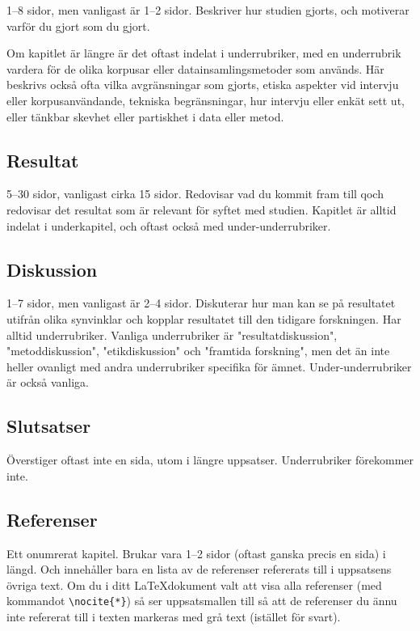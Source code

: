 1--8 sidor, men vanligast är 1--2 sidor. Beskriver hur studien gjorts, och
motiverar varför du gjort som du gjort.

Om kapitlet är längre är det oftast indelat i underrubriker, med en underrubrik
vardera för de olika korpusar eller datainsamlingsmetoder som används. Här
beskrivs också ofta vilka avgränsningar som gjorts, etiska aspekter vid
intervju eller korpusanvändande, tekniska begränsningar, hur intervju eller
enkät sett ut, eller tänkbar skevhet eller partiskhet i data eller metod.


\subsection{Resultat}
\label{rubrik.resultat}

5--30 sidor, vanligast cirka 15 sidor. Redovisar vad du kommit fram till qoch
redovisar det resultat som är relevant för syftet med studien. Kapitlet är
alltid indelat i underkapitel, och oftast också med under-underrubriker.


\subsection{Diskussion}
\label{rubrik.diskussion}

1--7 sidor, men vanligast är 2--4 sidor. Diskuterar hur man kan se på
resultatet utifrån olika synvinklar och kopplar resultatet till den tidigare
forskningen. Har alltid underrubriker. Vanliga underrubriker är
"resultatdiskussion", "metoddiskussion", "etikdiskussion" och "framtida
forskning", men det än inte heller ovanligt med andra underrubriker specifika
för ämnet. Under-underrubriker är också vanliga.


\subsection{Slutsatser}
\label{rubrik.slutsats}

Överstiger oftast inte en sida, utom i längre uppsatser. Underrubriker
förekommer inte.


\subsection{Referenser}
\label{rubrik.referenser}

Ett onumrerat kapitel. Brukar vara 1--2 sidor (oftast ganska precis en sida) i
längd. Och innehåller bara en lista av de referenser refererats till i
uppsatsens övriga text. Om du i ditt \LaTeX dokument valt att visa alla
referenser (med kommandot \verb|\nocite{*}|) så ser uppsatsmallen till så att
de referenser du ännu inte refererat till i texten markeras med grå text
(istället för svart).

